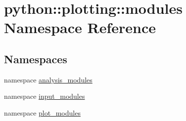 \hypertarget{namespacepython_1_1plotting_1_1modules}{
\section{python::plotting::modules Namespace Reference}
\label{namespacepython_1_1plotting_1_1modules}
}
\subsection*{Namespaces}
\begin{DoxyCompactItemize}
\item 
namespace \hyperlink{namespacepython_1_1plotting_1_1modules_1_1analysis__modules}{analysis\_\-modules}
\item 
namespace \hyperlink{namespacepython_1_1plotting_1_1modules_1_1input__modules}{input\_\-modules}
\item 
namespace \hyperlink{namespacepython_1_1plotting_1_1modules_1_1plot__modules}{plot\_\-modules}
\end{DoxyCompactItemize}
